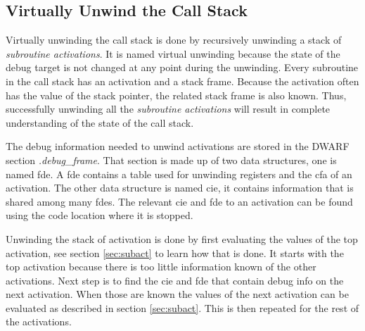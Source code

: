 \subsection{Virtually Unwind the Call Stack}
\label{sec:stacktrace}
 


Virtually unwinding the call stack is done by recursively unwinding a stack of \emph{subroutine activations}.
It is named virtual unwinding because the state of the debug target is not changed at any point during the unwinding.
Every subroutine in the call stack has an activation and a stack frame.
Because the activation often has the value of the stack pointer, the related stack frame is also known.
Thus, successfully unwinding all the \emph{subroutine activations} will result in complete understanding of the state of the call stack.


The debug information needed to unwind activations are stored in the \gls{DWARF} section \emph{.debug\_frame}.
That section is made up of two data structures, one is named \gls{fde}.
A \gls{fde} contains a table used for unwinding registers and the \gls{cfa} of an activation.
The other data structure is named \gls{cie}, it contains information that is shared among many \glspl{fde}.
The relevant \gls{cie} and \gls{fde} to an activation can be found using the code location where it is stopped.


Unwinding the stack of activation is done by first evaluating the values of the top activation, see section \ref{sec:subact} to learn how that is done.
It starts with the top activation because there is too little information known of the other activations.
Next step is to find the \gls{cie} and \gls{fde} that contain debug info on the next activation.
When those are known the values of the next activation can be evaluated as described in section \ref{sec:subact}.
This is then repeated for the rest of the activations.


